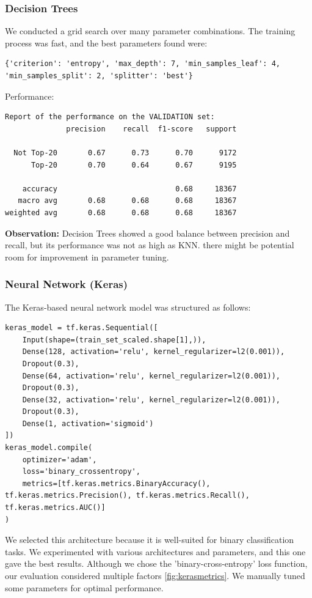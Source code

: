 \documentclass{article}
\begin{document}
\subsubsection{Decision Trees}
We conducted a grid search over many parameter combinations.
The training process was fast, and the best parameters found were:
\begin{verbatim}
{'criterion': 'entropy', 'max_depth': 7, 'min_samples_leaf': 4, 'min_samples_split': 2, 'splitter': 'best'}
\end{verbatim}

Performance:
\begin{verbatim}
Report of the performance on the VALIDATION set:
              precision    recall  f1-score   support

  Not Top-20       0.67      0.73      0.70      9172
      Top-20       0.70      0.64      0.67      9195

    accuracy                           0.68     18367
   macro avg       0.68      0.68      0.68     18367
weighted avg       0.68      0.68      0.68     18367
\end{verbatim}

\textbf{Observation:} Decision Trees showed a good balance between precision and recall, but its performance was not as high as KNN. there might be potential room for improvement in parameter tuning.

\subsubsection{Neural Network (Keras)}
The Keras-based neural network model was structured as follows:
\begin{verbatim}
keras_model = tf.keras.Sequential([
    Input(shape=(train_set_scaled.shape[1],)),
    Dense(128, activation='relu', kernel_regularizer=l2(0.001)),
    Dropout(0.3),
    Dense(64, activation='relu', kernel_regularizer=l2(0.001)),
    Dropout(0.3),
    Dense(32, activation='relu', kernel_regularizer=l2(0.001)),
    Dropout(0.3),
    Dense(1, activation='sigmoid')
])
keras_model.compile(
    optimizer='adam',
    loss='binary_crossentropy',
    metrics=[tf.keras.metrics.BinaryAccuracy(), tf.keras.metrics.Precision(), tf.keras.metrics.Recall(), tf.keras.metrics.AUC()]
)
\end{verbatim}

We selected this architecture because it is well-suited for binary classification tasks. We experimented with various architectures and parameters, and this one gave the best results. Although we chose the 'binary-cross-entropy' loss function, our evaluation considered multiple factors \ref{fig:kerasmetrics}. We manually tuned some parameters for optimal performance.
\end{document}

